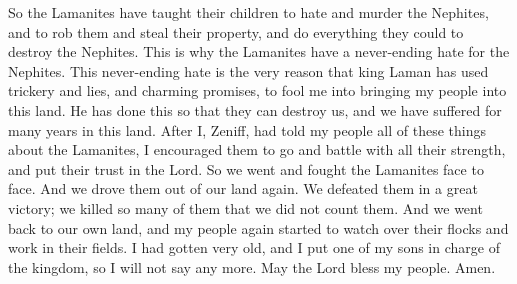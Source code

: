 So the Lamanites have taught their children to hate and murder the Nephites, and to rob them and steal their property, and do everything they could to destroy the Nephites. This is why the Lamanites have a never-ending hate for the Nephites.
\bverse \iffalse For this very cause has king Laman, by his cunning, and lying craftiness, and his fair promises, deceived me, that I have brought this my people up into this land, that they may destroy them; yea, and we have suffered these many years in the land. \fi
This never-ending hate is the very reason that king Laman has used trickery and lies, and charming promises, to fool me into bringing my people into this land. He has done this so that they can destroy us, and we have suffered for many years in this land.
\bverse \iffalse And now I, Zeniff, after having told all these things unto my people concerning the Lamanites, I did stimulate them to go to battle with their might, putting their trust in the Lord; therefore, we did contend with them, face to face. \fi
After I, Zeniff, had told my people all of these things about the Lamanites, I encouraged them to go and battle with all their strength, and put their trust in the Lord. So we went and fought the Lamanites face to face.
\bverse \iffalse And it came to pass that we did drive them again out of our land; and we slew them with a great slaughter, even so many that we did not number them. \fi
And we drove them out of our land again. We defeated them in a great victory; we killed so many of them that we did not count them.
\bverse \iffalse And it came to pass that we returned again to our own land, and my people again began to tend their flocks, and to till their ground. \fi
And we went back to our own land, and my people again started to watch over their flocks and work in their fields.
\bverse \iffalse And now I, being old, did confer the kingdom upon one of my sons; therefore, I say no more. And may the Lord bless my people. Amen. \fi
I had gotten very old, and I put one of my sons in charge of the kingdom, so I will not say any more. May the Lord bless my people. Amen.


